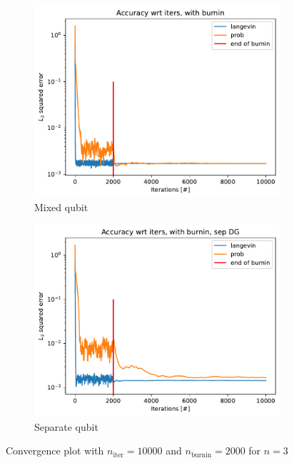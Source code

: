 \documentclass[12pt]{memoir}
\newcommand{\nitern}[1]{$n_{\text{iter}}=#1$}
\newcommand{\nburninn}[1]{$n_{\text{burnin}}=#1$}
\begin{document}
\begin{figure}[H]

    \centering

    \begin{subfigure}[b]{0.49\textwidth}
        \centering
        \includegraphics[width=\textwidth]{figures/experiments/baseline/iters_acc_comp_iters_no_avg-1.png}
        \caption{Mixed qubit}
        \label{fig:conv-plot-mixed-DG-sub}
    \end{subfigure}
    \hfill
    \begin{subfigure}[b]{0.49\textwidth}
        \centering
        \includegraphics[width=\textwidth]{figures/experiments/baseline/iters_acc_comp_iters_no_avg_sep.png}
        \caption{Separate qubit}
        \label{fig:conv-plot-sep-DG-sub}
    \end{subfigure}
    \caption{Convergence plot with \nitern{10000} and \nburninn{2000} for $n=3$}
    \label{fig:conv-plot}

\end{figure}
\end{document}
